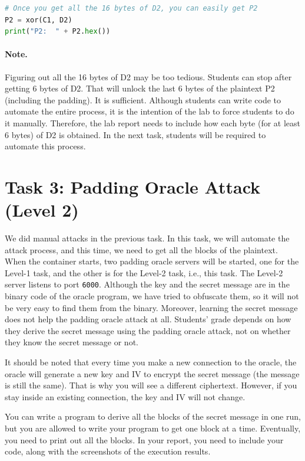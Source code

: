 \begin{lstlisting}[language=python]
# Once you get all the 16 bytes of D2, you can easily get P2
P2 = xor(C1, D2)
print("P2:  " + P2.hex())
\end{lstlisting}
 
\paragraph{Note.} Figuring out all the 16 bytes of D2 may be too
tedious. Students can stop after getting 6 bytes of D2. That will 
unlock the last 6 bytes of the plaintext P2 (including
the padding). It is sufficient. 
Although students can write code to automate the entire process, it is the 
intention of the lab to force students to do it manually. 
Therefore, the lab report needs to include how each byte (for at least 6 bytes) 
of D2 is obtained. 
In the next task, students will be required to automate this process. 


\section{Task 3: Padding Oracle Attack (Level 2)}


We did manual attacks in the previous task. In this task,
we will automate the attack process, and this time, we 
need to get all the blocks of the plaintext. When the 
container starts, two padding oracle servers will be started, one for the 
Level-1 task, and the other is for the Level-2 task, i.e.,
this task. The Level-2 server listens to port \texttt{6000}. 
Although the key and the secret message are in the 
binary code of the oracle program, we have tried to 
obfuscate them, so it will not be very easy to 
find them from the binary. Moreover, learning the secret
message does not help the padding oracle attack at all. Students'
grade depends on how they derive the secret message using
the padding oracle attack, not on whether they know the secret message
or not.


It should be noted that every time you make a new connection to the 
oracle, the oracle will generate a new key and IV to encrypt the 
secret message (the message is still the same). That is why
you will see a different ciphertext. 
However, if you stay inside an existing connection, 
the key and IV will not change. 


You can write a program to derive all the blocks
of the secret message in one run, but 
you are allowed to write your program to get one block 
at a time. Eventually, you need to print out all the 
blocks. In your report, you need to include your code, along with 
the screenshots of the execution results. 




